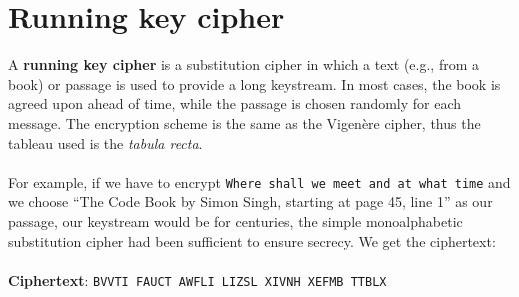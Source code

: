 \documentclass[Lau,binding=0.6cm,oneside]{sapthesis}
\begin{document}
\section{Running key cipher}
A \textbf{running key cipher} is a substitution cipher in which a text (e.g., from a book) or passage is used to provide a long keystream. In most cases, the book is agreed upon ahead of time, while the passage is chosen randomly for each message. The encryption scheme is the same as the Vigenère cipher, thus the tableau used is the \textit{tabula recta}.\\\\
For example, if we have to encrypt \colorbox{gray!12}{\small{\texttt{Where shall we meet and at what time}}} and we choose “The Code Book by Simon Singh, starting at page 45, line 1” as our passage, our keystream would be \textsf{for centuries, the simple monoalphabetic substitution cipher had been sufficient to ensure secrecy}. We get the ciphertext:\\\\
\textbf{Ciphertext}: \colorbox{gray!12}{\small{\texttt{BVVTI FAUCT AWFLI LIZSL XIVNH XEFMB TTBLX}}}\\\
\end{document}
